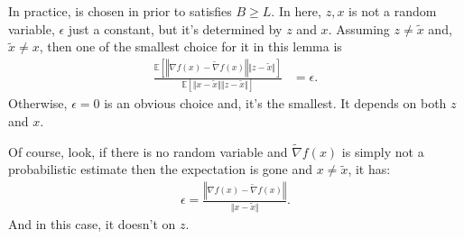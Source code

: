 \documentclass[12pt]{article}
\newcommand{\expect}{\ensuremath{\mathbb E}}
\begin{document}
        \begin{remark}
            In practice, is chosen in prior to satisfies $B \ge L$. 
            In here, $z, x$ is not a random variable, $\epsilon$ just a constant, but it's determined by $z$ and $x$. 
            Assuming $z \neq \tilde x$ and, $\tilde x \neq x$, then one of the smallest choice for it in this lemma is
            \begin{align*}
                \frac{
                \expect \left[
                    \left\Vert \nabla f(x) - \tilde \nabla f(x) \right\Vert \Vert z - \tilde x\Vert
                \right]
                }{
                \expect \left[
                    \Vert x - \tilde x\Vert\Vert z - \tilde x\Vert
                \right]
                } &= \epsilon. 
            \end{align*}
            Otherwise, $\epsilon = 0$ is an obvious choice and, it's the smallest. 
            It depends on both $z$ and $x$. 
            \par
            Of course, look, if there is no random variable and $\tilde \nabla f(x)$ is simply not a probabilistic estimate then the expectation is gone and $x\neq \tilde x$, it has: 
            \begin{align*}
                \epsilon = \frac{\left\Vert
                    \nabla f(x) - \tilde \nabla f(x)
                \right\Vert}{\Vert x - \tilde x\Vert}.
            \end{align*}
            And in this case, it doesn't on $z$. 
        \end{remark}
\end{document}
